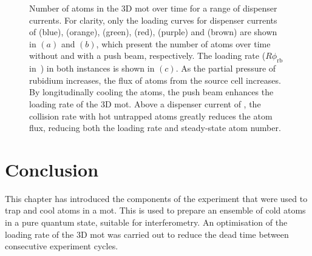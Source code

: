 \begin{figure}[!htbp]
	\caption[3D \ac{mot} atom number vs dispenser current with and without a
		push beam.]{Number of atoms in the 3D \ac{mot} over time for a range of
		dispenser currents. For clarity, only the loading curves for dispenser
		currents of
		 (blue),
		(orange),  (green),  (red),
		 (purple) and  (brown) are
		shown in \((a)\) and \((b)\), which present the number of atoms over
		time without and with a push beam, respectively. The loading rate (\(R
		\phi_\text{rb}\) in~) in both instances is
		shown in \((c)\). As the partial pressure of rubidium increases, the
		flux of atoms from the source cell increases. By longitudinally cooling
		the atoms, the push beam enhances the loading rate of the 3D \ac{mot}.
		Above a dispenser current of
		, the collision rate with hot untrapped atoms greatly reduces the atom flux, reducing both the loading rate and steady-state atom number.}
	\label{fig:loading_plots}
\end{figure}

\section{Conclusion}
This chapter has introduced the components of the experiment that were used to
trap and cool atoms in a \ac{mot}. This is used to prepare an ensemble of cold
atoms in a pure quantum state, suitable for interferometry. An optimisation of
the loading rate of the 3D \ac{mot} was carried out to reduce the dead time
between consecutive experiment cycles. 
